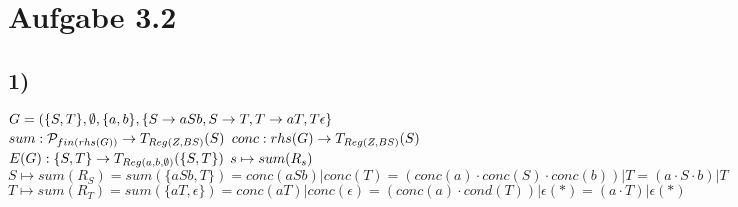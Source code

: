 \section*{Aufgabe 3.2}
\subsection*{1)}
$G=(\{S,T\},\emptyset,\{a,b\},\{S\rightarrow aSb, S\rightarrow T, T\rightarrow aT, T\epsilon\}\\$
$sum: \mathcal{P}_{fin(rhs(G))}\rightarrow T_{Reg(Z,BS)}(S)\\$
$conc: rhs(G)\rightarrow T_{Reg(Z,BS)}(S)\\$
$E(G): \{S,T\} \rightarrow T_{Reg({a,b},\emptyset)}(\{S,T\})\\$
$s\mapsto sum(R_s)\\$
$S\mapsto sum(R_S)=sum(\{aSb,T\})=conc(aSb)|conc(T)=(conc(a)\cdot conc(S)\cdot conc(b))|T=(a\cdot S\cdot b)|T$\\
$T\mapsto sum(R_T)=sum(\{aT,\epsilon\})=conc(aT)|conc(\epsilon)=(conc(a)\cdot cond(T))|\epsilon(*)=(a\cdot T)|\epsilon(*)$
